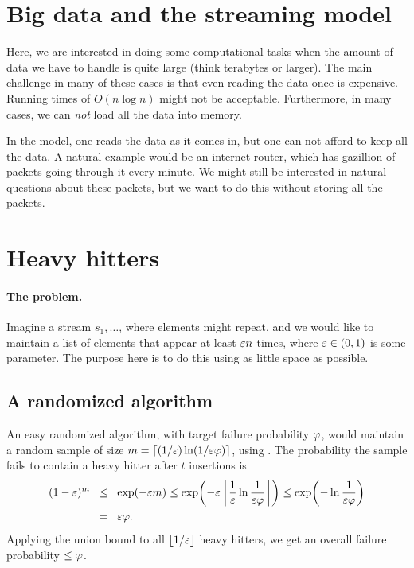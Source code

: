 \section{Big data and the streaming model}

Here, we are interested in doing some computational tasks when the
amount of data we have to handle is quite large (think terabytes or
larger).  The main challenge in many of these cases is that even
reading the data once is expensive. Running times of $O(n \log n)$
might not be acceptable. Furthermore, in many cases, we can \emph{not}
load all the data into memory.

In the  model, one reads the data as it comes in, but
one can not afford to keep all the data. A natural example would be an
internet router, which has gazillion of packets going through it every
minute. We might still be interested in natural questions about these
packets, but we want to do this without storing all the packets.






\section{Heavy hitters}

\paragraph*{The problem.}
Imagine a stream $s_1,\ldots$, where elements might repeat, and we
would like to maintain a list of elements that appear at least
${\varepsilon} n$ times, where ${\varepsilon} \in (0,1)$ is some parameter. The purpose
here is to do this using as little space as possible.

\subsection{A randomized algorithm}

An easy randomized algorithm, with target failure probability $\varphi$,
would maintain a random sample of size
$m = \left\lceil {(1/{\varepsilon}) \ln( 1/{\varepsilon}\varphi)} \right\rceil$, using . The probability the sample fails to
contain a heavy hitter after $t$ insertions is
\begin{align*}
    (1-\eps)^m
    &\LEQ
    \exp(-\eps m )%
    \leq%
    \exp\pth{-\eps \ceil{\frac{1}{\eps} \ln \frac{1}{\eps \BadProb}} }%
    \leq 
    \exp\pth{- \ln \frac{1}{\eps \BadProb}}%
    \\&
    \EQ 
    {\eps \BadProb}.
\end{align*}
Applying the union bound to all $\left\lfloor {1/{\varepsilon}} \right\rfloor$ heavy hitters, we get an
overall failure probability $\leq \varphi$.



